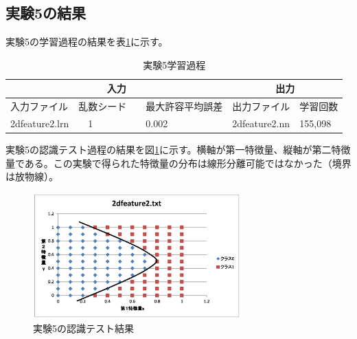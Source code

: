 \documentclass[final]{jarticle}[2012/05/15]
\begin{document}
\subsection{実験5の結果}
実験5の学習過程の結果を表\ref{zi_ga_5}に示す。\par
\begin{table}[h]
  \begin{center}
    \caption{実験5学習過程} \label{zi_ga_5}
    \begin{tabular}{|l|l|l|l|l|}\hline
    \multicolumn{3}{|c|}{入力} & \multicolumn{2}{|c|}{出力} \\ \hline
      入力ファイル & 乱数シード &　最大許容平均誤差 & 出力ファイル & 学習回数 \\ \hline
      2dfeature2.lrn &　1 &　0.002 & 2dfeature2.nn & 155,098 \\ \hline
    \end{tabular}
  \end{center}
\end{table}
実験5の認識テスト過程の結果を図\ref{zi_ke_5}に示す。横軸が第一特徴量、縦軸が第二特徴量である。この実験で得られた特徴量の分布は線形分離可能ではなかった（境界は放物線）。\par
\begin{figure}[htbp]
  \centering
  \includegraphics[width=8cm]{2dfeature2.eps}
  \caption{実験5の認識テスト結果} \label{zi_ke_5}
\end{figure}
\pagebreak
\end{document}
